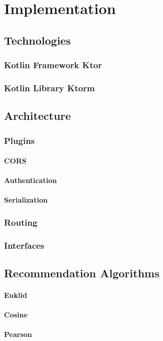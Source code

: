 \chapter{Implementation}

\section{Technologies}
\subsection{Kotlin Framework Ktor}

\subsection{Kotlin Library Ktorm}

\section{Architecture}

\subsection{Plugins}
\subsubsection{CORS}
\subsubsection{Authentication}
\subsubsection{Serialization}

\subsection{Routing}

\subsection{Interfaces}

\section{Recommendation Algorithms}

\subsubsection{Euklid}

\subsubsection{Cosine}

\subsubsection{Pearson}